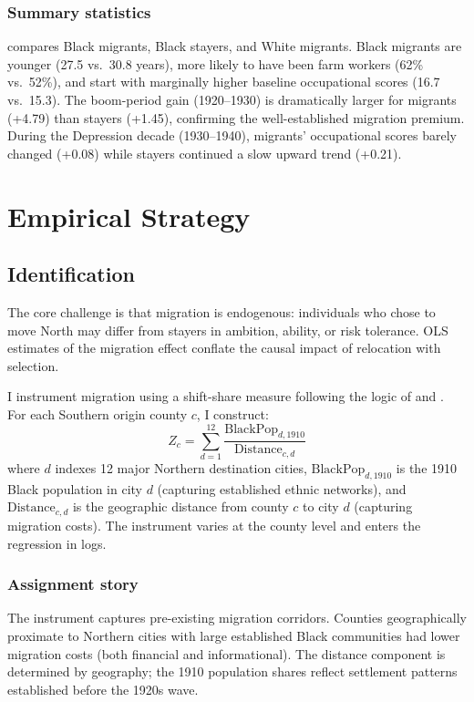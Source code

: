 \documentclass[12pt]{article}
\begin{document}
\subsubsection*{Summary statistics}  compares Black migrants, Black stayers, and White migrants. Black migrants are younger (27.5 vs.\ 30.8 years), more likely to have been farm workers (62\% vs.\ 52\%), and start with marginally higher baseline occupational scores (16.7 vs.\ 15.3). The boom-period gain (1920--1930) is dramatically larger for migrants (+4.79) than stayers (+1.45), confirming the well-established migration premium. During the Depression decade (1930--1940), migrants' occupational scores barely changed (+0.08) while stayers continued a slow upward trend (+0.21).




\section{Empirical Strategy}

\subsection{Identification}

The core challenge is that migration is endogenous: individuals who chose to move North may differ from stayers in ambition, ability, or risk tolerance. OLS estimates of the migration effect conflate the causal impact of relocation with selection.

I instrument migration using a shift-share measure following the logic of \citet{card2001} and \citet{boustan2010}. For each Southern origin county $c$, I construct:
\begin{equation}
Z_c = \sum_{d=1}^{12} \frac{\text{BlackPop}_{d,1910}}{\text{Distance}_{c,d}}
\end{equation}
where $d$ indexes 12 major Northern destination cities, $\text{BlackPop}_{d,1910}$ is the 1910 Black population in city $d$ (capturing established ethnic networks), and $\text{Distance}_{c,d}$ is the geographic distance from county $c$ to city $d$ (capturing migration costs). The instrument varies at the county level and enters the regression in logs.

\subsubsection*{Assignment story} The instrument captures pre-existing migration corridors. Counties geographically proximate to Northern cities with large established Black communities had lower migration costs (both financial and informational). The distance component is determined by geography; the 1910 population shares reflect settlement patterns established before the 1920s wave.
\end{document}
